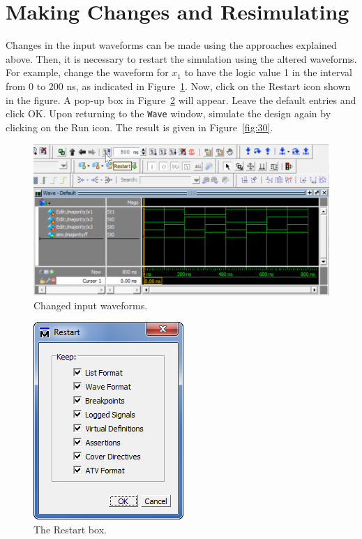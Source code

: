 \documentclass[11pt, twoside, pdftex]{article}
\begin{document}
\section{Making Changes and Resimulating}

Changes in the input waveforms can be made using the approaches explained above. Then, it
is necessary to restart the simulation using the altered waveforms. For example, change the
waveform for $x_1$ to have the logic value 1 in the interval from 0 to 200 ns, as indicated
in Figure~\ref{fig:28}. Now, click on the {\sf Restart} icon shown in the figure. A pop-up box in
Figure~\ref{fig:29} will appear. Leave the default entries and click {\sf OK}. Upon returning 
to the \texttt{Wave} window, simulate the design again by clicking on the {\sf Run} icon. 
The result is given in Figure~\ref{fig:30}.

\begin{figure}[H]
   \begin{center}
      \includegraphics[scale=1.0]{figures/figure28.png}
   \caption{Changed input waveforms.} 
	 \label{fig:28}
	 \end{center}
\end{figure}

\begin{figure}[H]
   \begin{center}
      \includegraphics[scale=0.8]{figures/figure29.png}
   \caption{The Restart box.} 
	 \label{fig:29}
	 \end{center}
\end{figure}
\end{document}
